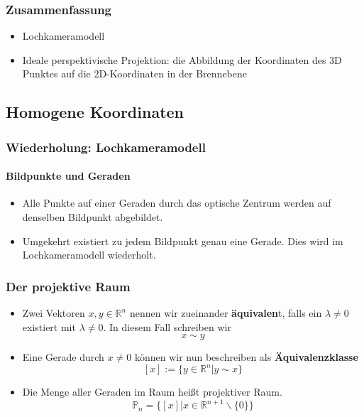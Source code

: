 \documentclass[12pt, a4paper, oneside]{article}
\begin{document}
\subsubsection{Zusammenfassung}

\begin{itemize}
    \item Lochkameramodell
    \item Ideale perspektivische Projektion: die Abbildung der Koordinaten des 3D Punktes 
    auf die 2D-Koordinaten in der Brennebene
\end{itemize}

\subsection{Homogene Koordinaten}

\subsubsection{Wiederholung: Lochkameramodell}

\paragraph*{Bildpunkte und Geraden}

\begin{itemize}
    \item Alle Punkte auf einer Geraden durch das optische Zentrum werden auf denselben Bildpunkt abgebildet. 
    \item Umgekehrt existiert zu jedem Bildpunkt genau eine Gerade. Dies wird im Lochkameramodell wiederholt.
\end{itemize}

\subsubsection{Der projektive Raum}

\begin{itemize}
    \item Zwei Vektoren $x,y\in\mathbb{R}^n$ nennen wir zueinander \textbf{äquivalen}t, 
    falls ein $\lambda\neq 0$ existiert mit \( \lambda \neq 0 \). 
    In diesem Fall schreiben wir $$x\sim y$$
    \item Eine Gerade durch $x\neq 0$ können wir nun beschreiben als \textbf{Äquivalenzklasse}
    $$[x]:=\{y\in\mathbb{R}^n|y\sim x\}$$
    \item Die Menge aller Geraden im Raum heißt projektiver Raum.
    $$\mathbb{P}_n = \{[x]|x\in\mathbb{R}^{n+1}\backslash \{0\}\}$$
\end{itemize}
\end{document}
